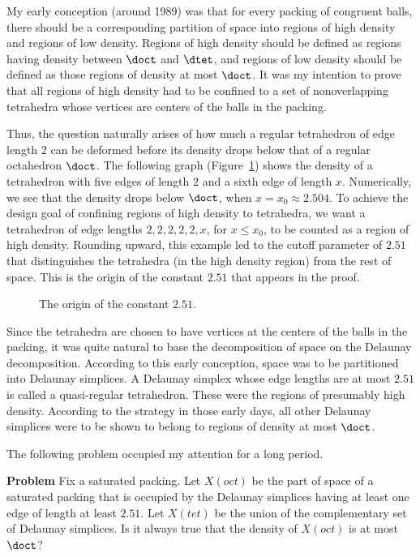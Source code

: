 My early conception (around 1989) was that for every packing of
congruent balls, there should be a corresponding partition of space
into regions of high density and regions of low density. Regions of
high density should be defined as regions having density between
$\doct$ and $\dtet$, and regions of low density should be defined as
those regions of density at most $\doct$.  It was my intention to
prove that all regions of high density had to be confined to a set
of nonoverlapping tetrahedra whose vertices are centers of the balls
in the packing.

Thus, the question naturally arises of how much a regular
tetrahedron of edge length $2$ can be deformed before its density
drops below that of a regular octahedron $\doct$.  The following
graph (Figure~\ref{fig:t51}) shows the density of a tetrahedron with
five edges of length $2$ and a sixth edge of length $x$.
Numerically, we see that the density drops below $\doct$, when
$x=x_0\approx 2.504$. To achieve the design goal of confining
regions of high density to tetrahedra, we want a tetrahedron of edge
lengths $2,2,2,2,2,x$, for $x\le x_0$, to be counted as a region of
high density. Rounding upward, this example led to the cutoff
parameter of $2.51$ that distinguishes the tetrahedra (in the high
density region) from the rest of space. This is the origin of the
constant $2.51$ that appears in the proof.


\begin{figure}[htb]
  \centering
  \caption{The origin of the constant $2.51$.}
  \label{fig:t51}
\end{figure}

Since the tetrahedra are chosen to have vertices at the centers of
the balls in the packing, it was quite natural to base the
decomposition of space on the Delaunay decomposition. According to
this early conception, space was to be partitioned into Delaunay
simplices.  A Delaunay simplex whose edge lengths are at most
$2.51$ is called a quasi-regular tetrahedron.  These were the
regions of presumably high density.  According to the strategy in
those early days, all other Delaunay simplices were to be shown to
belong to regions of density at most $\doct$.

The following problem occupied my attention for a long period.


\smallskip\noindent
{\bf Problem} Fix a saturated packing. Let $X(oct)$ be the part of
space of a saturated packing that is occupied by the Delaunay
simplices having at least one edge of length at least $2.51$.  Let
$X(tet)$ be the union of the complementary set of Delaunay
simplices.  Is it always true that the density of $X(oct)$ is at
most $\doct$?

